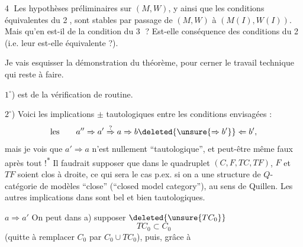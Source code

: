 
\textcircled{4} Les hypothèses préliminaires sur $(M,W)$, y
ainsi que les conditions équivalentes du \textcircled{2},
sont stables par passage de $(M,W)$ à
$(M(I),W(I))$. Mais qu'en est-il de la
condition du \textcircled{3} ? Est-elle conséquence
des conditions du \textcircled{2} (i.e. leur est-elle
équivalente ?).

Je vais esquisser la démonstration du
théorème, pour cerner le travail technique
qui reste à faire.

$1^\circ$) est de la vérification de routine.

$2^\circ$) Voici les implications $\pm$ tautologiques
entre les conditions envisagées :
\[
 \text{les}\qquad a''\Rightarrow a'\overset{?}{\Rightarrow}a\Rightarrow b\deleted{\unsure{\Rightarrow b'}}\Leftarrow b',
\]
mais je vois que $a'\Rightarrow a$ n'est  nullement
``tautologique'', et peut-être même faux
après tout !\textsuperscript{$*$} Il faudrait supposer que dans
le quadruplet $(C,F,TC,TF)$, $F$ et $TF$ soient clos
à droite,  ce qui sera le cas p.ex. si
on a une structure de $Q$-catégorie de
modèles ``close'' (``closed model category''), au
sens de Quillen. Les autres  implications dans
\unsure{(*)} sont bel et bien tautologiques.

$a\Rightarrow a'$ On peut dans a) supposer $\deleted{\unsure{TC_0}}$
\[
 TC_0\subset C_0
\]
(quitte à remplacer $C_0$ par $C_0\cup TC_0$), puis, grâce à
